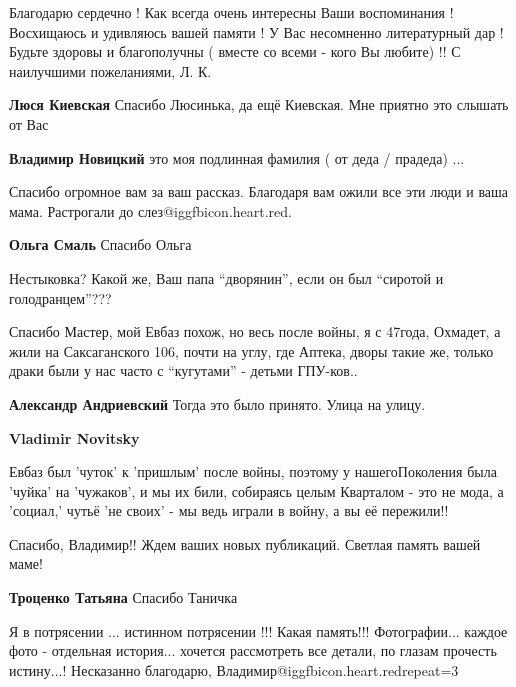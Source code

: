 \begin{itemize}

Благодарю сердечно ! Как всегда очень интересны Ваши воспоминания ! Восхищаюсь
и удивляюсь вашей памяти ! У Вас несомненно литературный дар ! Будьте здоровы и
благополучны ( вместе со всеми - кого Вы любите) !! С наилучшими пожеланиями,
Л. К.

\begin{itemize} %
\textbf{Люся Киевская} Спасибо Люсинька, да ещё Киевская. Мне приятно это слышать от Вас

\textbf{Владимир Новицкий} это моя подлинная фамилия ( от деда / прадеда) ...
\end{itemize} %

Спасибо огромное вам за ваш рассказ. Благодаря вам ожили все эти люди и ваша мама. Растрогали до слез@igg{fbicon.heart.red}.

\textbf{Ольга Смаль} Спасибо Ольга


Нестыковка? Какой же, Ваш папа \enquote{дворянин}, если он был \enquote{сиротой и голодранцем}???



Спасибо Мастер, мой Евбаз похож, но весь после войны, я с 47года, Охмадет, а жили
на Саксаганского 106, почти на углу, где Аптека, дворы такие же, только драки
были у нас часто с \enquote{кугутами} - детьми ГПУ-ков..

\begin{itemize} %
\textbf{Александр Андриевский} Тогда это было принято. Улица на улицу.

\textbf{Vladimir Novitsky} 

Евбаз был 'чуток' к 'пришлым' после войны, поэтому у нашегоПоколения была 'чуйка'
на 'чужаков', и мы их били, собираясь целым Кварталом - это не мода, а 'социал,'
чутьё 'не своих' - мы ведь играли в войну, а вы её пережили!!

\end{itemize} %

Спасибо, Владимир!! Ждем ваших новых публикаций. Светлая память вашей маме!

\textbf{Троценко Татьяна} Спасибо Таничка


Я в потрясении ... истинном потрясении !!! Какая память!!! Фотографии... каждое
фото - отдельная история... хочется рассмотреть все детали, по глазам прочесть
истину...! Несказанно благодарю, Владимир@igg{fbicon.heart.red}{repeat=3}


\end{itemize}
